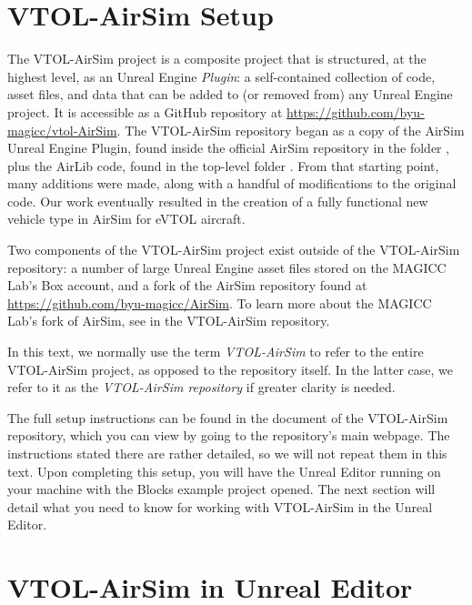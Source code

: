 \section{VTOL-AirSim Setup}\label{sec:vtolairsim_setup}
The VTOL-AirSim project is a composite project that is structured, at the highest level, as an Unreal Engine \textit{Plugin}: a self-contained collection of code, asset files, and data that can be added to (or removed from) any Unreal Engine project. It is accessible as a GitHub repository at \url{https://github.com/byu-magicc/vtol-AirSim}. The VTOL-AirSim repository began as a copy of the AirSim Unreal Engine Plugin, found inside the official AirSim repository in the folder , plus the AirLib code, found in the top-level folder . From that starting point, many additions were made, along with a handful of modifications to the original code. Our work eventually resulted in the creation of a fully functional new vehicle type in AirSim for eVTOL aircraft.

Two components of the VTOL-AirSim project exist outside of the VTOL-AirSim repository: a number of large Unreal Engine asset files stored on the MAGICC Lab's Box account, and a fork of the AirSim repository found at \url{https://github.com/byu-magicc/AirSim}. To learn more about the MAGICC Lab's fork of AirSim, see  in the VTOL-AirSim repository.

In this text, we normally use the term \textit{VTOL-AirSim} to refer to the entire VTOL-AirSim project, as opposed to the repository itself. In the latter case, we refer to it as the \textit{VTOL-AirSim repository} if greater clarity is needed.

The full setup instructions can be found in the  document of the VTOL-AirSim repository, which you can view by going to the repository's main webpage. The instructions stated there are rather detailed, so we will not repeat them in this text. Upon completing this setup, you will have the Unreal Editor running on your machine with the Blocks example project opened. The next section will detail what you need to know for working with VTOL-AirSim in the Unreal Editor.

\section{VTOL-AirSim in Unreal Editor}\label{sec:vtolairsim_unreal}

